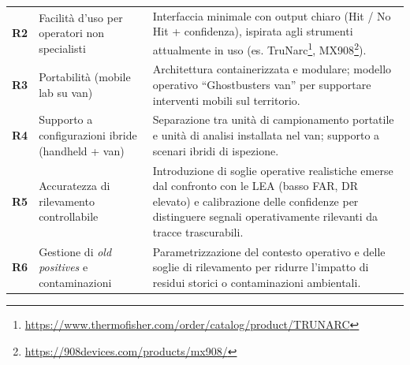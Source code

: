 \begin{longtable}{>{\bfseries}p{1cm} p{4cm} p{7cm}}
    R2  & Facilità d’uso per operatori non specialisti      &
    Interfaccia minimale con output chiaro (Hit / No Hit + confidenza), ispirata agli strumenti attualmente in uso (es. TruNarc\footnote{\url{https://www.thermofisher.com/order/catalog/product/TRUNARC}}, MX908\footnote{\url{https://908devices.com/products/mx908/}}). \\

    R3  & Portabilità (mobile lab su van)                   &
    Architettura containerizzata e modulare; modello operativo ``Ghostbusters van'' per supportare interventi mobili sul territorio.                                                                                                                                                                                                                                                                                                                  \\

    R4  & Supporto a configurazioni ibride (handheld + van) &
    Separazione tra unità di campionamento portatile e unità di analisi installata nel van; supporto a scenari ibridi di ispezione.                                                                                                                                                                                                                                                                                                                   \\

    R5  & Accuratezza di rilevamento controllabile          &
    Introduzione di soglie operative realistiche emerse dal confronto con le LEA (basso FAR, DR elevato) e calibrazione delle confidenze per distinguere segnali operativamente rilevanti da tracce trascurabili.                                                                                                                                                                                                                                 \\

    R6  & Gestione di \emph{old positives} e contaminazioni &
    Parametrizzazione del contesto operativo e delle soglie di rilevamento per ridurre l’impatto di residui storici o contaminazioni ambientali.                                                                                                                                                                                                                                                                                                      \\


\end{longtable}
